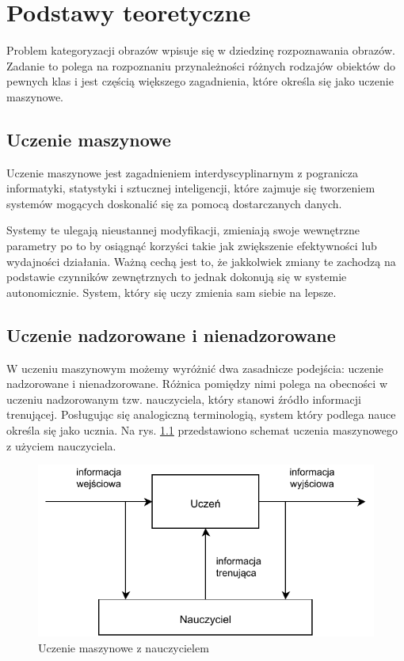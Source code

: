 \chapter{Podstawy teoretyczne}

Problem kategoryzacji obrazów wpisuje się w dziedzinę rozpoznawania obrazów. Zadanie to polega na rozpoznaniu przynależności różnych rodzajów obiektów do pewnych klas\cite{Tad91} i jest częścią większego zagadnienia, które określa się jako uczenie maszynowe.

\section{Uczenie maszynowe}

Uczenie maszynowe jest zagadnieniem interdyscyplinarnym z pogranicza informatyki, statystyki i sztucznej inteligencji, które zajmuje się tworzeniem systemów mogących doskonalić się za pomocą dostarczanych danych.

Systemy te ulegają nieustannej modyfikacji, zmieniają swoje wewnętrzne parametry po to by osiągnąć korzyści takie jak zwiększenie efektywności lub wydajności działania. Ważną cechą jest to, że jakkolwiek zmiany te zachodzą na podstawie czynników zewnętrznych to jednak dokonują się w systemie autonomicznie. System, który się uczy zmienia sam siebie na lepsze\cite{CICHOSZ00}.

\section{Uczenie nadzorowane i nienadzorowane}

W uczeniu maszynowym możemy wyróżnić dwa zasadnicze podejścia: uczenie nadzorowane i nienadzorowane. Różnica pomiędzy nimi polega na obecności w uczeniu nadzorowanym tzw. nauczyciela, który stanowi źródło informacji trenującej. Posługując się analogiczną terminologią, system który podlega nauce określa się jako ucznia. Na rys. \ref{fig:supervised-learning} przedstawiono schemat uczenia maszynowego z użyciem nauczyciela.

\begin{figure}[h]
	\centering
	\includegraphics{graphics/01_podstawy_teoretyczne/supervised-learning.pdf}
	\caption{Uczenie maszynowe z nauczycielem \cite{CICHOSZ00}}
	\label{fig:supervised-learning}
\end{figure}

